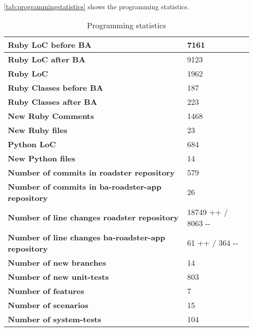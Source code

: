 \autoref{tab:programmingstatistics} shows the programming statistics.
\begin{table}[H]
  \centering
  \begin{tabular}{|m{50mm}|m{30mm}|}
   \hline
	\bf Ruby LoC before BA & 7161 \\
	\hline
	\bf Ruby LoC after BA  & 9123 \\
	\hline
	\bf Ruby LoC & 1962 \\
	\hline
	\bf Ruby Classes before BA & 187 \\
	\hline
	\bf Ruby Classes after BA & 223 \\
	\hline
	\bf New Ruby Comments & 1468 \\
	\hline
	\bf New Ruby files & 23 \\
	\hline
	\bf Python LoC & 684 \\
	\hline
	\bf New Python files & 14 \\
	\hline
	\bf Number of commits in 
		\newline roadster repository & 579 \\
	\hline
	\bf Number of commits in 
		\newline ba-roadster-app repository & 26 \\
	\hline
	\bf Number of line changes 
		\newline roadster repository & 18749{\color{green!70} ++} / 8063{\color{red!70} -{}-} \\
	\hline
	\bf Number of line changes 
		\newline ba-roadster-app repository & 61{\color{green!70} ++} / 364{\color{red!70} -{}-} \\
	\hline
	\bf Number of new branches & 14 \\
	\hline
	\bf Number of new unit-tests & 803 \\
	\hline
	\bf Number of features & 7 \\
	\hline
	\bf Number of scenarios & 15 \\
	\hline
	\bf Number of system-tests & 104 \\
    \hline
  \end{tabular} \\
  \caption{Programming statistics}
  \label{tab:programmingstatistics}
\end{table}
